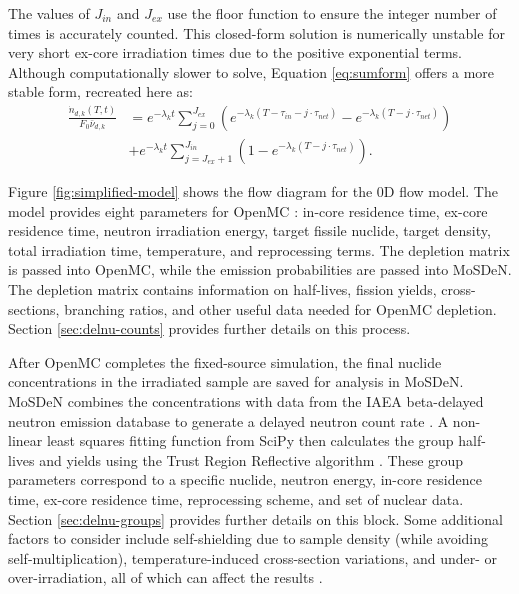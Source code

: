 The values of $J_{in}$ and $J_{ex}$ use the floor function to ensure the integer number of times is accurately counted.
This closed-form solution is numerically unstable for very short ex-core irradiation times due to the positive exponential terms.
Although computationally slower to solve, Equation \eqref{eq:sumform} offers a more stable form, recreated here as:
\begin{align}
\frac{\dot{n}_{d, k}(T, t)}{F_0 \bar{\nu}_{d, k}} &= e^{-\lambda_k t} \sum_{j=0}^{J_{ex}} \left( e^{-\lambda_k (T - \tau_{in} - j \cdot \tau_{net})} - e^{-\lambda_k (T - j \cdot \tau_{net})}  \right) \nonumber \\ &+ e^{-\lambda_k t} \sum_{j=J_{ex}+1}^{J_{in}} \left( 1 - e^{-\lambda_k (T - j \cdot \tau_{net})} \right).
\end{align}

Figure \ref{fig:simplified-model} shows the flow diagram for the 0D flow model.
The model provides eight parameters for OpenMC \cite{romano_openmc_2015}: in-core residence time, ex-core residence time, neutron irradiation energy, target fissile nuclide, target density, total irradiation time, temperature, and reprocessing terms.
The depletion matrix is passed into OpenMC, while the emission probabilities are passed into \gls{MoSDeN}.
The depletion matrix contains information on half-lives, fission yields, cross-sections, branching ratios, and other useful data needed for OpenMC depletion.
Section \ref{sec:delnu-counts} provides further details on this process.

After OpenMC completes the fixed-source simulation, the final nuclide concentrations in the irradiated sample are saved for analysis in \gls{MoSDeN}.
\gls{MoSDeN} combines the concentrations with data from the IAEA beta-delayed neutron emission database to generate a delayed neutron count rate \cite{DIMITRIOU2021144}.
A non-linear least squares fitting function from SciPy then calculates the group half-lives and yields using the Trust Region Reflective algorithm \cite{scipy, branch1999subspace}.
These group parameters correspond to a specific nuclide, neutron energy, in-core residence time, ex-core residence time, reprocessing scheme, and set of nuclear data.
Section \ref{sec:delnu-groups} provides further details on this block.
Some additional factors to consider include self-shielding due to sample density (while avoiding self-multiplication), temperature-induced cross-section variations, and under- or over-irradiation, all of which can affect the results \cite{keepin1957delayed}.

